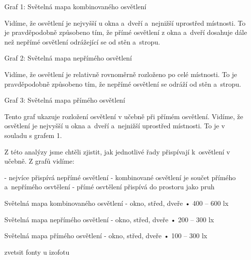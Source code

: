 Graf 1: Světelná mapa kombinovaného osvětlení

Vidíme, že osvětlení je nejvyšší u okna a~dveří a~nejnižší uprostřed místnosti.
To je pravděpodobně způsobeno tím, že přímé osvětlení z okna a~dveří dosahuje dále než nepřímé osvětlení
odrážející se od stěn a~stropu.

Graf 2: Světelná mapa nepřímého osvětlení

Vidíme, že osvětlení je relativně rovnoměrně rozloženo po celé místnosti. To je pravděpodobně způsobeno tím,
že nepřímé osvětlení se odráží od stěn a~stropu.

Graf 3: Světelná mapa přímého osvětlení

Tento graf ukazuje rozložení osvětlení v učebně při přímém osvětlení. Vidíme, že osvětlení je nejvyšší
u okna a~dveří a~nejnižší uprostřed místnosti. To je v souladu s grafem 1.

Z této analýzy jsme chtěli zjistit, jak jednotlivé řady přispívají k~osvětlení v učebně. Z grafů vidíme:

- nejvíce přispívá nepřímé osvětlení
- kombinované osvětlení je součet přímého a~nepřímého osvtělení
- přímé osvtělení přispívá do prostoru jako pruh

Světelná mapa kombinovaného osvětlení - okno, střed, dveře
    • 400 – 600 lx

Světelná mapa nepřímého osvětlení - okno, střed, dveře
    • 200 – 300 lx

Světelná mapa přímého osvětlení - okno, střed, dveře
    • 100 – 300 lx

    \medskip zvetsit fonty u izofotu